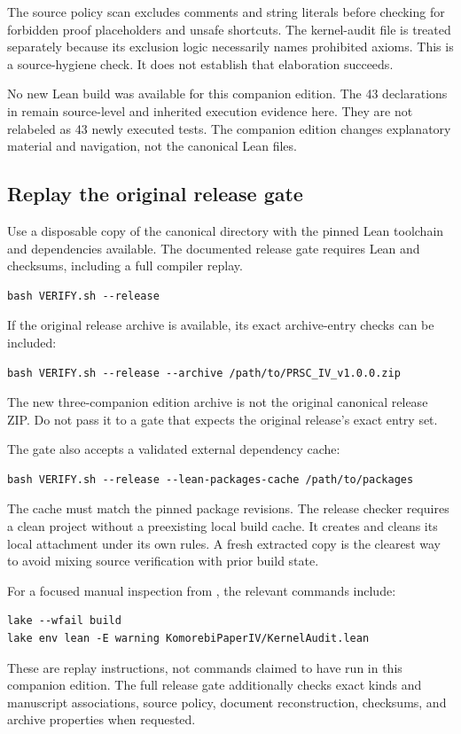 The source policy scan excludes comments and string literals before checking for forbidden proof placeholders and unsafe shortcuts. The kernel-audit file is treated separately because its exclusion logic necessarily names prohibited axioms. This is a source-hygiene check. It does not establish that elaboration succeeds.

No new Lean build was available for this companion edition. The 43 declarations in  remain source-level and inherited execution evidence here. They are not relabeled as 43 newly executed tests. The companion edition changes explanatory material and navigation, not the canonical Lean files.

\subsection{Replay the original release gate}
Use a disposable copy of the canonical  directory with the pinned Lean toolchain and dependencies available. The documented release gate requires Lean and checksums, including a full compiler replay.
\begin{Verbatim}[fontsize=\small,breaklines=true,breakanywhere=true]
bash VERIFY.sh --release
\end{Verbatim}
If the original release archive is available, its exact archive-entry checks can be included:
\begin{Verbatim}[fontsize=\small,breaklines=true,breakanywhere=true]
bash VERIFY.sh --release --archive /path/to/PRSC_IV_v1.0.0.zip
\end{Verbatim}
The new three-companion edition archive is not the original canonical release ZIP. Do not pass it to a gate that expects the original release's exact entry set.

The gate also accepts a validated external dependency cache:
\begin{Verbatim}[fontsize=\small,breaklines=true,breakanywhere=true]
bash VERIFY.sh --release --lean-packages-cache /path/to/packages
\end{Verbatim}
The cache must match the pinned package revisions. The release checker requires a clean project without a preexisting local build cache. It creates and cleans its local attachment under its own rules. A fresh extracted copy is the clearest way to avoid mixing source verification with prior build state.

For a focused manual inspection from , the relevant commands include:
\begin{Verbatim}[fontsize=\small,breaklines=true,breakanywhere=true]
lake --wfail build
lake env lean -E warning KomorebiPaperIV/KernelAudit.lean
\end{Verbatim}
These are replay instructions, not commands claimed to have run in this companion edition. The full release gate additionally checks exact kinds and manuscript associations, source policy, document reconstruction, checksums, and archive properties when requested.

